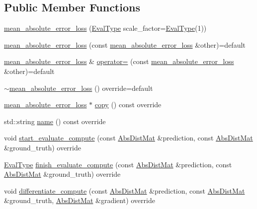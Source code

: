 \subsection*{Public Member Functions}
\begin{DoxyCompactItemize}
\item 
\hyperlink{classlbann_1_1mean__absolute__error__loss_a80845866345cf8c4daba645683022bc2}{mean\+\_\+absolute\+\_\+error\+\_\+loss} (\hyperlink{base_8hpp_a3266f5ac18504bbadea983c109566867}{Eval\+Type} scale\+\_\+factor=\hyperlink{base_8hpp_a3266f5ac18504bbadea983c109566867}{Eval\+Type}(1))
\item 
\hyperlink{classlbann_1_1mean__absolute__error__loss_a7f151beb5f22ccb0d35979184f48a366}{mean\+\_\+absolute\+\_\+error\+\_\+loss} (const \hyperlink{classlbann_1_1mean__absolute__error__loss}{mean\+\_\+absolute\+\_\+error\+\_\+loss} \&other)=default
\item 
\hyperlink{classlbann_1_1mean__absolute__error__loss}{mean\+\_\+absolute\+\_\+error\+\_\+loss} \& \hyperlink{classlbann_1_1mean__absolute__error__loss_afad15a66cbc3650767a8a1297474ac0e}{operator=} (const \hyperlink{classlbann_1_1mean__absolute__error__loss}{mean\+\_\+absolute\+\_\+error\+\_\+loss} \&other)=default
\item 
\hyperlink{classlbann_1_1mean__absolute__error__loss_aec85d66fc980cc62be4ae54bd737e945}{$\sim$mean\+\_\+absolute\+\_\+error\+\_\+loss} () override=default
\item 
\hyperlink{classlbann_1_1mean__absolute__error__loss}{mean\+\_\+absolute\+\_\+error\+\_\+loss} $\ast$ \hyperlink{classlbann_1_1mean__absolute__error__loss_aae4bf8c6a5986ae3895b4900f961fd77}{copy} () const override
\item 
std\+::string \hyperlink{classlbann_1_1mean__absolute__error__loss_ae44350a67a0be0357291827f194d9f77}{name} () const override
\item 
void \hyperlink{classlbann_1_1mean__absolute__error__loss_a6c93ac9c9dbcdec66e2a63caf25bccf9}{start\+\_\+evaluate\+\_\+compute} (const \hyperlink{base_8hpp_a9a697a504ae84010e7439ffec862b470}{Abs\+Dist\+Mat} \&prediction, const \hyperlink{base_8hpp_a9a697a504ae84010e7439ffec862b470}{Abs\+Dist\+Mat} \&ground\+\_\+truth) override
\item 
\hyperlink{base_8hpp_a3266f5ac18504bbadea983c109566867}{Eval\+Type} \hyperlink{classlbann_1_1mean__absolute__error__loss_a0b6518199e86abc197e811f0a1ff7868}{finish\+\_\+evaluate\+\_\+compute} (const \hyperlink{base_8hpp_a9a697a504ae84010e7439ffec862b470}{Abs\+Dist\+Mat} \&prediction, const \hyperlink{base_8hpp_a9a697a504ae84010e7439ffec862b470}{Abs\+Dist\+Mat} \&ground\+\_\+truth) override
\item 
void \hyperlink{classlbann_1_1mean__absolute__error__loss_af1d8c8bacc959273f9f54eafbe5c1f7d}{differentiate\+\_\+compute} (const \hyperlink{base_8hpp_a9a697a504ae84010e7439ffec862b470}{Abs\+Dist\+Mat} \&prediction, const \hyperlink{base_8hpp_a9a697a504ae84010e7439ffec862b470}{Abs\+Dist\+Mat} \&ground\+\_\+truth, \hyperlink{base_8hpp_a9a697a504ae84010e7439ffec862b470}{Abs\+Dist\+Mat} \&gradient) override
\end{DoxyCompactItemize}

